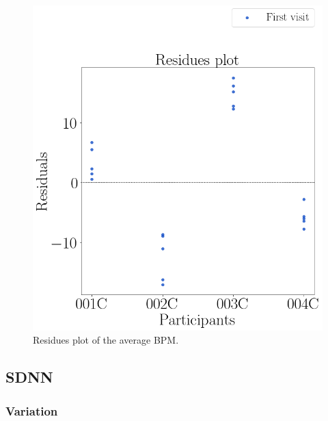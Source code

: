 \begin{figure}[!htb]
\begin{minipage}{0.45\linewidth}
                \includegraphics[width = \linewidth]{Resultados/ECG/Figuras/png/residplot_bpm.png}
                \caption{Residues plot of the average BPM.}
                \label{fig:residual_bpm_average}
            \end{minipage}
        \end{figure}

\FloatBarrier

\subsection{SDNN}

    \subsubsection{Variation}


